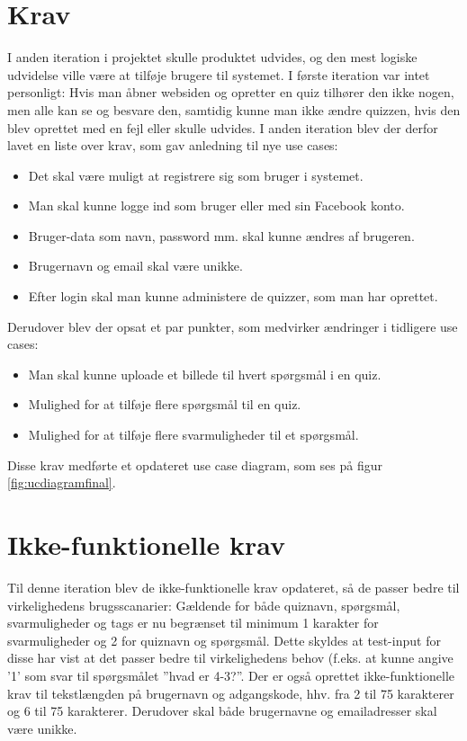 \section{Krav}
I anden iteration i projektet skulle produktet udvides, og den mest logiske udvidelse ville være at tilføje brugere til systemet. I første iteration var intet personligt: Hvis man åbner websiden og opretter en quiz tilhører den ikke nogen, men alle kan se og besvare den, samtidig kunne man ikke ændre quizzen, hvis den blev oprettet med en fejl eller skulle udvides.
I anden iteration blev der derfor lavet en liste over krav, som gav anledning til nye use cases:
\begin{itemize}
\item Det skal være muligt at registrere sig som bruger i systemet.
\item Man skal kunne logge ind som bruger eller med sin Facebook konto.
\item Bruger-data som navn, password mm. skal kunne ændres af brugeren.
\item Brugernavn og email skal være unikke.
\item Efter login skal man kunne administere de quizzer, som man har oprettet.
\end{itemize}

Derudover blev der opsat et par punkter, som medvirker ændringer i tidligere use cases:
\begin{itemize}
\item Man skal kunne uploade et billede til hvert spørgsmål i en quiz.
\item Mulighed for at tilføje flere spørgsmål til en quiz.
\item Mulighed for at tilføje flere svarmuligheder til et spørgsmål.
\end{itemize}

Disse krav medførte et opdateret use case diagram, som ses på figur \ref{fig:ucdiagramfinal}.



\section{Ikke-funktionelle krav}
Til denne iteration blev de ikke-funktionelle krav opdateret, så de passer bedre til virkelighedens brugsscanarier:
Gældende for både quiznavn, spørgsmål, svarmuligheder og tags er nu begrænset til minimum 1 karakter for svarmuligheder og 2 for quiznavn og spørgsmål. Dette skyldes at test-input for disse har vist at det passer bedre til virkelighedens behov (f.eks. at kunne angive '1' som svar til spørgsmålet ''hvad er 4-3?''.
Der er også oprettet ikke-funktionelle krav til tekstlængden på brugernavn og adgangskode, hhv. fra 2 til 75 karakterer og 6 til 75 karakterer. 
Derudover skal både brugernavne og emailadresser skal være unikke.
